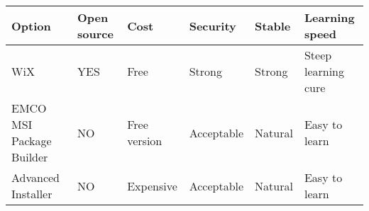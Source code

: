 \documentclass{article}
\begin{document}
		\begin{center}
			\begin{tabular}{ | l | l | l | l | l | p{5cm} |}
			\hline
			Option & Open source & Cost & Security & Stable & Learning speed\\ \hline
			WiX & YES & Free & Strong & Strong & Steep learning cure\\ \hline
			EMCO MSI Package Builder & NO & Free version & Acceptable & Natural & Easy to learn\\ \hline
			Advanced Installer & NO & Expensive & Acceptable & Natural & Easy to learn\\ \hline
			\end{tabular}
		\end{center}
	
\end{document}
